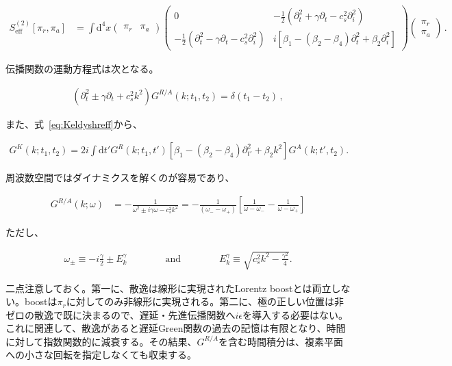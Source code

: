 \documentclass[a4paper,11pt]{ltjsarticle}
\numberwithin{equation}{section}
\def\pia{\pi_{a}}
\def\pir{\pi_{r}}
\newcommand{\dd}{\mathrm{d}}
\newcommand{\Eq}[1]{Eq.~(\ref{#1})}
\renewcommand{\Eq}[1]{式~\eqref{#1}}
\begin{document}
\begin{align}
S^{(2)}_{\mathrm{eff}} \left[\pir,\pia\right] &= \int \dd^4 x  \begin{pmatrix}
\pir & \pia
\end{pmatrix} \begin{pmatrix}
0 & -\frac{1}{2}\left(\partial_t^2 + \gamma \partial_t - c_s^2 \partial_i^2  \right)\\
-\frac{1}{2}\left(\partial_t^2 - \gamma \partial_t - c_s^2 \partial_i^2\right)  & i\left[\beta_{1}-(\beta_{2}-\beta_{4})\partial^{2}_{t}+\beta_{2}\partial_{i}^{2}\right]
\end{pmatrix} \begin{pmatrix}
\pir \\ \pia
\end{pmatrix}\,.
\end{align}

伝播関数の運動方程式は次となる。

\begin{align}
\left(\partial_t^2 \pm \gamma \partial_t + c_s^2 k^2 \right) G^{R/A} (k; t_1, t_2) =  \delta(t_1-t_2)\,,			 
\end{align}

また、\Eq{eq:Keldyshreff}から、

\begin{align}
G^K (k;t_1,t_2) = 2 i \int \dd t' G^{R} (k;t_1,t') \left[\beta_1- (\beta_{2}-\beta_{4}) \partial_{t'}^2 + \beta_2 k^2 \right] G^{A} (k;t',t_2).
\end{align}

周波数空間ではダイナミクスを解くのが容易であり、

\begin{align}
G^{R/A} (k; \omega) &= - \frac{1}{\omega^2 \pm i \gamma \omega - c_s^2k^2}= -\frac{1}{(\omega_- - \omega_+)} \left[ \frac{1}{\omega- \omega_-} - \frac{1}{\omega- \omega_+}   \right]
\end{align}

ただし、

\begin{align}
\omega_\pm \equiv - i \frac{\gamma}{2} \pm E_k^{\gamma} \qquad \qquad \mathrm{and} \qquad \qquad 	E_k^{\gamma} \equiv \sqrt{c_s^2 k^2 - \frac{\gamma^2}{4}}.
\end{align}

二点注意しておく。第一に、散逸は線形に実現されたLorentz boostとは両立しない。boostは$\pi_r$に対してのみ非線形に実現される。第二に、極の正しい位置は非ゼロの散逸で既に決まるので、遅延・先進伝播関数へ$i\epsilon$を導入する必要はない。これに関連して、散逸があると遅延Green関数の過去の記憶は有限となり、時間に対して指数関数的に減衰する。その結果、$G^{R/A}$を含む時間積分は、複素平面への小さな回転を指定しなくても収束する。
\end{document}
